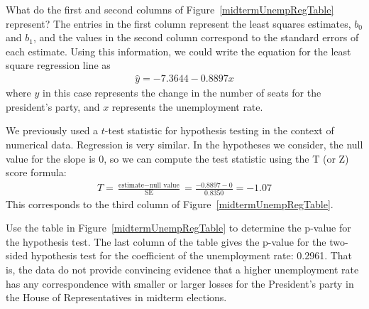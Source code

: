 \begin{examplewrap}
\begin{nexample}{What do the first and second columns
    of Figure~\ref{midtermUnempRegTable} represent?}
  The entries in the first column represent the least
  squares estimates, $b_0$ and $b_1$, and the values in
  the second column correspond to the standard errors
  of each estimate.
  Using this information, we could write the equation
  for the least square regression line as
  \begin{align*}
  \hat{y} = -7.3644 - 0.8897 x
  \end{align*}
  where $y$ in this case represents the change in the number
  of seats for the president's party,
  and $x$ represents the unemployment rate.
\end{nexample}
\end{examplewrap}

We previously used a $t$-test statistic for hypothesis testing in the context of numerical data. Regression is very similar. In the hypotheses we consider, the null value for the slope is 0, so we can compute the test statistic using the T (or Z) score formula:
\begin{align*}
T = \frac{\text{estimate} - \text{null value}}{\text{SE}} = \frac{-0.8897 - 0}{0.8350} = -1.07
\end{align*}
This corresponds to the third column of
Figure~\ref{midtermUnempRegTable}.


\begin{examplewrap}
\begin{nexample}{Use the table in
    Figure~\ref{midtermUnempRegTable}
    to determine the p-value for the hypothesis test.}
  The last column of the table gives the p-value for
  the two-sided hypothesis test for the coefficient of
  the unemployment rate: 0.2961.
  That is, the data do not provide convincing evidence
  that a higher unemployment rate has any correspondence
  with smaller or larger losses for the President's party
  in the House of Representatives in midterm elections.
\end{nexample}
\end{examplewrap}

